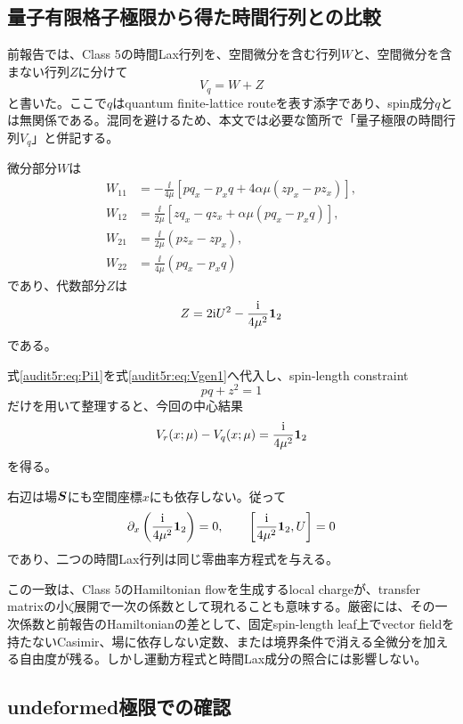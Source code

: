\subsection{量子有限格子極限から得た時間行列との比較}

前報告では、Class 5の時間Lax行列を、空間微分を含む行列$W$と、空間微分を含まない行列$Z$に分けて
\begin{equation}
V_q=W+Z
\label{audit5r:eq:Vq}
\end{equation}
と書いた。ここで$q$はquantum finite-lattice routeを表す添字であり、spin成分$q$とは無関係である。混同を避けるため、本文では必要な箇所で「量子極限の時間行列$V_q$」と併記する。

微分部分$W$は
\begin{align}
W_{11}&=-\frac{\ii}{4\mu}
\left[pq_x-p_xq+4\alpha\mu(zp_x-pz_x)\right],\\
W_{12}&=\frac{\ii}{2\mu}
\left[zq_x-qz_x+\alpha\mu(pq_x-p_xq)\right],\\
W_{21}&=\frac{\ii}{2\mu}(pz_x-zp_x),\\
W_{22}&=\frac{\ii}{4\mu}(pq_x-p_xq)
\label{audit5r:eq:Wcomponents}
\end{align}
であり、代数部分$Z$は
\begin{equation}
Z=2\mathrm i U^2-\frac{\mathrm i}{4\mu^2}\mathbf 1_2
\label{audit5r:eq:Z}
\end{equation}
である。

式\eqref{audit5r:eq:Pi1}を式\eqref{audit5r:eq:Vgen1}へ代入し、spin-length constraint
\[
pq+z^2=1
\]
だけを用いて整理すると、今回の中心結果
\begin{equation}
V_r(x;\mu)-V_q(x;\mu)
=
\frac{\mathrm i}{4\mu^2}\mathbf 1_2
\label{audit5r:eq:central}
\end{equation}
を得る。

右辺は場$\boldsymbol S$にも空間座標$x$にも依存しない。従って
\begin{equation}
\partial_x\left(\frac{\mathrm i}{4\mu^2}\mathbf 1_2\right)=0,
\qquad
\left[\frac{\mathrm i}{4\mu^2}\mathbf 1_2,U\right]=0
\end{equation}
であり、二つの時間Lax行列は同じ零曲率方程式を与える。

この一致は、Class 5のHamiltonian flowを生成するlocal chargeが、transfer matrixの小$\zeta$展開で一次の係数として現れることも意味する。厳密には、その一次係数と前報告のHamiltonianの差として、固定spin-length leaf上でvector fieldを持たないCasimir、場に依存しない定数、または境界条件で消える全微分を加える自由度が残る。しかし運動方程式と時間Lax成分の照合には影響しない。

\subsection{undeformed極限での確認}


